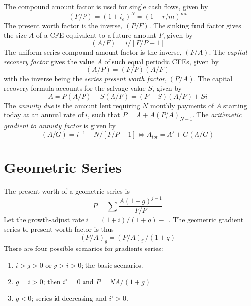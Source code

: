 \documentclass{tufte-book}
\begin{document}
\bigskip
The compound amount factor is used for single cash flows, given by \begin{equation}
  (F/P) = (1+i_e)^N = (1+r/m)^{mt}
\end{equation}
The present worth factor is the inverse, $(P/F)$. The sinking fund factor gives the size $A$ of a CFE equivalent to a future amount $F$, given by \begin{equation}
  (A/F) = i / [F/P - 1]
\end{equation}
%
%
The uniform series compound amount factor is the inverse, $(F/A)$. The \emph{capital recovery factor} gives the value $A$ of such equal periodic CFEs, given by \begin{equation}
  (A/P) = (F/P) (A/F)
\end{equation}
with the inverse being the \emph{series present worth factor}, $(P/A)$. The capital recovery formula accounts for the salvage value $S$, given by \begin{equation}
  A = P(A/P) - S(A/F) = (P-S)(A/P) + Si
\end{equation}
The \emph{annuity due} is the amount lent requiring $N$ monthly payments of $A$ starting today at an annual rate of $i$, such that $P = A + A(P/A)_{N-1}$. The \emph{arithmetic gradient to annuity factor} is given by \begin{equation}
  (A/G) = i^{-1} - N/[F/P - 1] \iff A_{tot} = A' + G(A/G)
\end{equation}

\section{Geometric Series}
The present worth of a geometric series is \begin{equation}
  P = \sum \frac{A(1+g)^{j-1}}{F/P}
\end{equation}
Let the growth-adjust rate $i^\circ = (1+i)/(1+g)-1$. The geometric gradient series to present worth factor is thus \begin{equation}
  (P/A)_g = (P/A)_{i^\circ} / (1+g)
\end{equation}
There are four possible scenarios for gradients series:
\begin{enumerate}
  \item $i>g>0$ or $g>i>0$; the basic scenarios.
  \item $g=i>0$; then $i^\circ = 0$ and $P = NA/(1+g)$
  \item $g<0$; series id decreasing and $i^\circ > 0$.
\end{enumerate}
\end{document}
